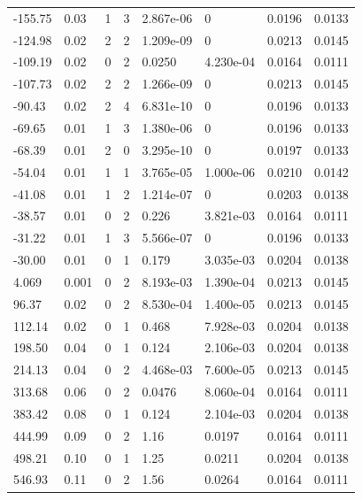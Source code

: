 \documentclass[preview]{standalone}
\begin{document}
{{\begin{tabular}{L{1.2cm}C{1.2cm} C{0.3cm}C{0.5cm} C{1.4cm}C{1.4cm} C{1.4cm}C{1.4cm}}
  -155.75  &  0.03  & 1     &  3 &  2.867e-06  & 0  & 0.0196 &  0.0133   \\ 
  -124.98  &  0.02  & 2     &  2 &  1.209e-09  & 0  & 0.0213 &  0.0145   \\ 
  -109.19  &  0.02  & 0     &  2 &  0.0250  & 4.230e-04  & 0.0164 &  0.0111   \\ 
  -107.73  &  0.02  & 2     &  2 &  1.266e-09  & 0  & 0.0213 &  0.0145   \\ 
  -90.43  &  0.02  & 2     &  4 &  6.831e-10  & 0  & 0.0196 &  0.0133   \\ 
  -69.65  &  0.01  & 1     &  3 &  1.380e-06  & 0  & 0.0196 &  0.0133   \\ 
  -68.39  &  0.01  & 2     &  0 &  3.295e-10  & 0  & 0.0197 &  0.0133   \\ 
  -54.04  &  0.01  & 1     &  1 &  3.765e-05  & 1.000e-06  & 0.0210 &  0.0142   \\ 
  -41.08  &  0.01  & 1     &  2 &  1.214e-07  & 0  & 0.0203 &  0.0138   \\ 
  -38.57  &  0.01  & 0     &  2 &  0.226  & 3.821e-03  & 0.0164 &  0.0111   \\ 
  -31.22  &  0.01  & 1     &  3 &  5.566e-07  & 0  & 0.0196 &  0.0133   \\ 
  -30.00  &  0.01  & 0     &  1 &  0.179  & 3.035e-03  & 0.0204 &  0.0138   \\ 
  4.069  &  0.001  & 0     &  2 &  8.193e-03  & 1.390e-04  & 0.0213 &  0.0145   \\ 
  96.37  &  0.02  & 0     &  2 &  8.530e-04  & 1.400e-05  & 0.0213 &  0.0145   \\ 
  112.14  &  0.02  & 0     &  1 &  0.468  & 7.928e-03  & 0.0204 &  0.0138   \\ 
  198.50  &  0.04  & 0     &  1 &  0.124  & 2.106e-03  & 0.0204 &  0.0138   \\ 
  214.13  &  0.04  & 0     &  2 &  4.468e-03  & 7.600e-05  & 0.0213 &  0.0145   \\ 
  313.68  &  0.06  & 0     &  2 &  0.0476  & 8.060e-04  & 0.0164 &  0.0111   \\ 
  383.42  &  0.08  & 0     &  1 &  0.124  & 2.104e-03  & 0.0204 &  0.0138   \\ 
  444.99  &  0.09  & 0     &  2 &  1.16  & 0.0197  & 0.0164 &  0.0111   \\ 
  498.21  &  0.10  & 0     &  1 &  1.25  & 0.0211  & 0.0204 &  0.0138   \\ 
  546.93  &  0.11  & 0     &  2 &  1.56  & 0.0264  & 0.0164 &  0.0111   \\ 

\end{tabular}}}
\end{document}
